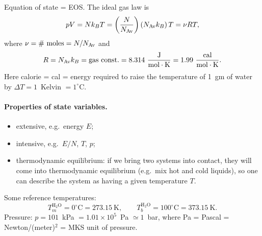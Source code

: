 Equation of state = EOS. The ideal gas law is
\begin{equation}
  pV = Nk_{B} T = \left(\frac{N}{N_{\mathrm{Av}}}\right)(N_{\mathrm{Av}}k_{B})\,T = \nu R T,
\end{equation}
where $\nu = \#\ \text{moles} = N/N_{\mathrm{Av}}$ and
\begin{equation}
  R = \NAv\kB = \text{gas const.} = 8.314\ \frac{\text{J}}{\text{mol}\cdot\text{K}}
  = 1.99\ \frac{\text{cal}}{\text{mol}\cdot\text{K}}.
\end{equation}
Here calorie = cal = energy required to raise the temperature of 1~gm of water by
$\Delta T = 1$~Kelvin $=1^\circ$C.

\paragraph{Properties of state variables.}

\begin{itemize}
  \item extensive, e.g.\ energy $E$;
  \item intensive, e.g.\ $E/N$, $T$, $p$;
  \item thermodynamic equilibrium: if we bring two systems into contact, they
    will come into thermodynamic equilibrium (e.g.\ mix hot and cold liquids),
    so one can describe the system as having a given temperature $T$.
\end{itemize}

\begin{diagram}
\end{diagram}

Some reference temperatures:
\begin{equation}
  T_m^{\mathrm{H_2O}} = 0^\circ\text{C} = 273.15\ \text{K},\qquad
  T_b^{\mathrm{H_2O}} = 100^\circ\text{C} = 373.15\ \text{K}.
\end{equation}
Pressure: $p = 101$~kPa $= 1.01\times 10^5$~Pa $\simeq 1$~bar, where
Pa = Pascal = Newton/(meter)$^2$ = MKS unit of pressure.

